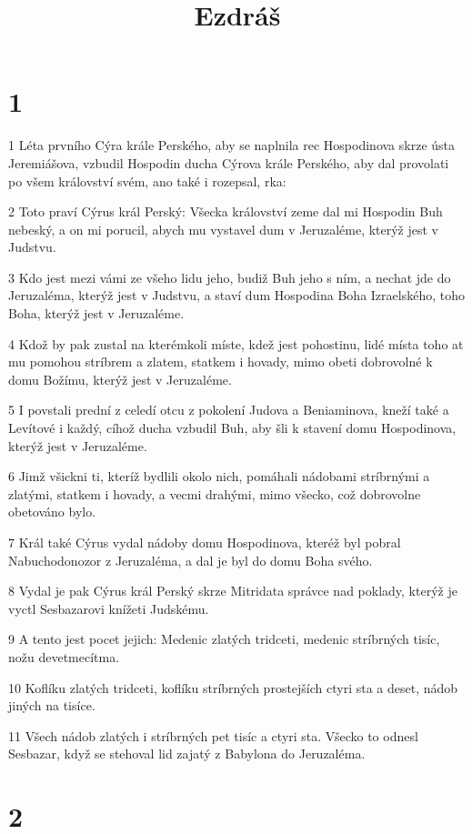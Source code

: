 

\title{Ezdráš}

\chapter{1}

\par 1 Léta prvního Cýra krále Perského, aby se naplnila rec Hospodinova skrze ústa Jeremiášova, vzbudil Hospodin ducha Cýrova krále Perského, aby dal provolati po všem království svém, ano také i rozepsal, rka:
\par 2 Toto praví Cýrus král Perský: Všecka království zeme dal mi Hospodin Buh nebeský, a on mi porucil, abych mu vystavel dum v Jeruzaléme, kterýž jest v Judstvu.
\par 3 Kdo jest mezi vámi ze všeho lidu jeho, budiž Buh jeho s ním, a nechat jde do Jeruzaléma, kterýž jest v Judstvu, a staví dum Hospodina Boha Izraelského, toho Boha, kterýž jest v Jeruzaléme.
\par 4 Kdož by pak zustal na kterémkoli míste, kdež jest pohostinu, lidé místa toho at mu pomohou stríbrem a zlatem, statkem i hovady, mimo obeti dobrovolné k domu Božímu, kterýž jest v Jeruzaléme.
\par 5 I povstali prední z celedí otcu z pokolení Judova a Beniaminova, kneží také a Levítové i každý, cíhož ducha vzbudil Buh, aby šli k stavení domu Hospodinova, kterýž jest v Jeruzaléme.
\par 6 Jimž všickni ti, kteríž bydlili okolo nich, pomáhali nádobami stríbrnými a zlatými, statkem i hovady, a vecmi drahými, mimo všecko, což dobrovolne obetováno bylo.
\par 7 Král také Cýrus vydal nádoby domu Hospodinova, kteréž byl pobral Nabuchodonozor z Jeruzaléma, a dal je byl do domu Boha svého.
\par 8 Vydal je pak Cýrus král Perský skrze Mitridata správce nad poklady, kterýž je vyctl Sesbazarovi knížeti Judskému.
\par 9 A tento jest pocet jejich: Medenic zlatých tridceti, medenic stríbrných tisíc, nožu devetmecítma.
\par 10 Koflíku zlatých tridceti, koflíku stríbrných prostejších ctyri sta a deset, nádob jiných na tisíce.
\par 11 Všech nádob zlatých i stríbrných pet tisíc a ctyri sta. Všecko to odnesl Sesbazar, když se stehoval lid zajatý z Babylona do Jeruzaléma.

\chapter{2}

